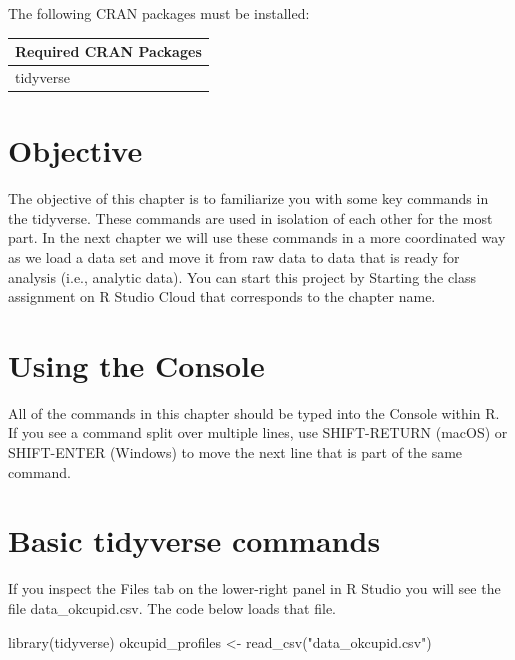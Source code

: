 \documentclass[
]{krantz}
\makeatletter
\newenvironment{Shaded}{\begin{snugshade}}{\end{snugshade}}
\newcommand{\FunctionTok}[1]{\textcolor[rgb]{0,0,0}{#1}}
\newcommand{\NormalTok}[1]{#1}
\newcommand{\OtherTok}[1]{\textcolor[rgb]{0.37,0.37,0.37}{#1}}
\newcommand{\StringTok}[1]{\textcolor[rgb]{0.5,0.5,0.5}{#1}}
\newenvironment{kframe}{%
\medskip{}
\setlength{\fboxsep}{.8em}
 \def\at@end@of@kframe{}%
 \ifinner\ifhmode%
  \def\at@end@of@kframe{\end{minipage}}%
  \begin{minipage}{\columnwidth}%
 \fi\fi%
 \def\FrameCommand##1{\hskip\@totalleftmargin \hskip-\fboxsep
 \colorbox{shadecolor}{##1}\hskip-\fboxsep
     \hskip-\linewidth \hskip-\@totalleftmargin \hskip\columnwidth}%
 \MakeFramed {\advance\hsize-\width
   \@totalleftmargin\z@ \linewidth\hsize
   \@setminipage}}%
 {\par\unskip\endMakeFramed%
 \at@end@of@kframe}
\renewenvironment{Shaded}{\begin{kframe}}{\end{kframe}}
\makeatother
\begin{document}
The following CRAN packages must be installed:

\begin{longtable}[]{@{}l@{}}
\toprule
Required CRAN Packages \\
\midrule
\endhead
tidyverse \\
\bottomrule
\end{longtable}

\hypertarget{objective}{%
\section{Objective}\label{objective}}

The objective of this chapter is to familiarize you with some key commands in the tidyverse. These commands are used in isolation of each other for the most part. In the next chapter we will use these commands in a more coordinated way as we load a data set and move it from raw data to data that is ready for analysis (i.e., analytic data). You can start this project by Starting the class assignment on R Studio Cloud that corresponds to the chapter name.

\hypertarget{using-the-console}{%
\section{Using the Console}\label{using-the-console}}

All of the commands in this chapter should be typed into the Console within R. If you see a command split over multiple lines, use SHIFT-RETURN (macOS) or SHIFT-ENTER (Windows) to move the next line that is part of the same command.

\hypertarget{basic-tidyverse-commands}{%
\section{Basic tidyverse commands}\label{basic-tidyverse-commands}}

If you inspect the Files tab on the lower-right panel in R Studio you will see the file data\_okcupid.csv. The code below loads that file.

\begin{Shaded}
\begin{Highlighting}[]
\FunctionTok{library}\NormalTok{(tidyverse)}
\NormalTok{okcupid\_profiles }\OtherTok{\textless{}{-}} \FunctionTok{read\_csv}\NormalTok{(}\StringTok{"data\_okcupid.csv"}\NormalTok{)}
\end{Highlighting}
\end{Shaded}
\end{document}
